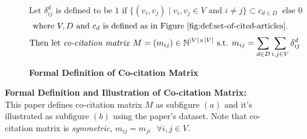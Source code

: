 \begin{figure}[ht]
    \begin{subfigure}[b]{1\textwidth}
        \[\text{Let } \delta^d_{ij} \text{ is defined to be } 1 \text{ if } \{(v_i, v_j) \mid v_i, v_j \in V \text{ and } i \neq j \} \subset c_{d \in D} \ \text{ else } 0\]
        \[\text{ where } V, D \text{ and } c_d \text{ is defined as in Figure \ref{fig:def:set-of-cited-articles}}. \]
        \[\text{Then let \textit{co-citation matrix} } M = (m_{ij}) \in \Bbb{N}^{|V| \times |V|} \text{ s.t. } m_{ij} = \sum_{d \in D}\sum_{i,j \in V}\delta^d_{ij}\]
        \caption{\textbf{Formal Definition of Co-citation Matrix}}
        \label{subfig:co-cites:def}
    \end{subfigure}
    \vfill
    \begin{subfigure}[b]{1\textwidth}
    \end{subfigure}
    \label{fig:def-illus-co-cites}      
    \caption{\textbf{Formal Definition and Illustration of Co-citation Matrix:} This paper defines co-citation matrix $M$ as subfigure $(a)$ and it's illustrated as subfigure $(b)$ using the paper's dataset. Note that co-citation matrix is \textit{symmetric}, $m_{ij} = m_{ji} \text{ } \forall i,j \in V$.} 
\end{figure}